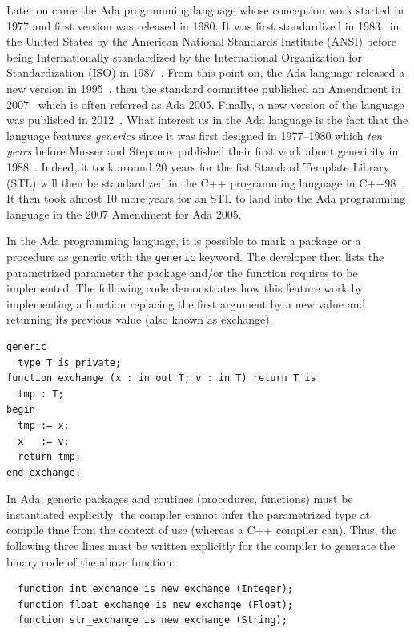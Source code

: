 Later on came the Ada programming language whose conception work started in 1977 and first version was released in 1980.
It was first standardized in 1983~\parencite{ansi.1983.ada} in the United States by the American National Standards
Institute (ANSI) before being Internationally standardized by the International Organization for Standardization (ISO)
in 1987~\parencite{iso.1987.ada}. From this point on, the Ada language released a new version in
1995~\parencite{iso.1995.ada, iso.1995.ada.corr}, then the standard committee published an Amendment in
2007~\parencite{iso.1995.ada.amend} which is often referred as Ada 2005. Finally, a new version of the language was
published in 2012~\parencite{iso.2012.ada,iso.2012.ada.corr}. What interest us in the Ada language is the fact that the
language features \emph{generics} since it was first designed in 1977--1980 which \emph{ten years} before Musser and
Stepanov published their first work about genericity in 1988~\parencite{musser.1988.generic}. Indeed, it took around 20
years for the fist Standard Template Library (STL) will then be standardized in the C++ programming language in
C++98~\parencite{iso.1998.cpp}. It then took almost 10 more years for an STL to land into the Ada programming language
in the 2007 Amendment for Ada 2005.

In the Ada programming language, it is possible to mark a package or a procedure as generic with the \texttt{generic}
keyword. The developer then lists the parametrized parameter the package and/or the function requires to be implemented.
The following code demonstrates how this feature work by implementing a function replacing the first argument by a new
value and returning its previous value (also known as exchange).

\begin{verbatim}
generic
  type T is private;
function exchange (x : in out T; v : in T) return T is
  tmp : T;
begin
  tmp := x;
  x   := v;
  return tmp;
end exchange;
\end{verbatim}

In Ada, generic packages and routines (procedures, functions) must be instantiated explicitly: the compiler cannot infer
the parametrized type at compile time from the context of use (whereas a C++ compiler can). Thus, the following three
lines must be written explicitly for the compiler to generate the binary code of the above function:
\begin{verbatim}
  function int_exchange is new exchange (Integer);
  function float_exchange is new exchange (Float);
  function str_exchange is new exchange (String);
\end{verbatim}

